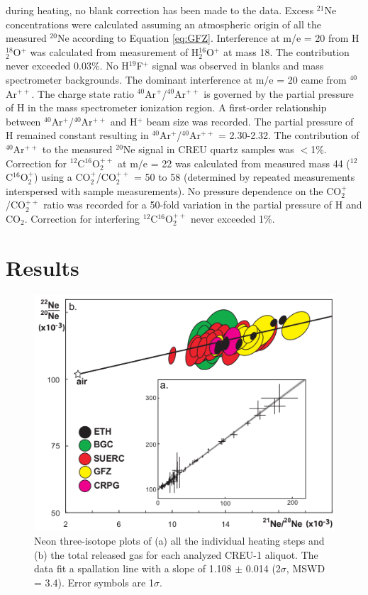 \documentclass[authoryear,review,12pt]{elsarticle}
\begin{document}
during heating, no blank correction has been made to the data.  Excess
$^{21}$Ne concentrations were calculated assuming an atmospheric
origin of all the measured $^{20}$Ne according to Equation
\ref{eq:GFZ}.  Interference at m/e = 20 from H$_2^{18}$O$^+$ was
calculated from measurement of H$_2^{16}$O$^+$ at mass 18. The
contribution never exceeded 0.03\%. No H$^{19}$F$^+$ signal was
observed in blanks and mass spectrometer backgrounds. The dominant
interference at m/e = 20 came from $^{40}$Ar$^{++}$. The charge state
ratio $^{40}$Ar$^+$/$^{40}$Ar$^{++}$ is governed by the partial
pressure of H in the mass spectrometer ionization region. A
first-order relationship between $^{40}$Ar$^+$/$^{40}$Ar$^{++}$ and
H$^+$ beam size was recorded.  The partial pressure of H remained
constant resulting in $^{40}$Ar$^+$/$^{40}$Ar$^{++}$ = 2.30-2.32. The
contribution of $^{40}$Ar$^{++}$ to the measured $^{20}$Ne signal in
CREU quartz samples was $<$1\%.  Correction for
$^{12}$C$^{16}$O$_2^{++}$ at m/e = 22 was calculated from measured
mass 44 ($^{12}$C$^{16}$O$_2^{+}$) using a CO$_2^{+}$/CO$_2^{++}$ = 50
to 58 (determined by repeated measurements interspersed with sample
measurements). No pressure dependence on the CO$_2^+$/CO$_2^{++}$
ratio was recorded for a 50-fold variation in the partial pressure of
H and CO$_2$. Correction for interfering $^{12}$C$^{16}$O$_2^{++}$
never exceeded 1\%.

\section{Results}
\label{sec:results}

\begin{figure}
\includegraphics[width=500pt]{Figure1.png}
\caption{Neon three-isotope plots of (a) all the individual heating
  steps and (b) the total released gas for each analyzed CREU-1
  aliquot.  The data fit a spallation line with a slope of 1.108 $\pm$
  0.014 (2$\sigma$, MSWD = 3.4). Error symbols are 1$\sigma$.}
\label{fig:3-isotope}
\end{figure}
\end{document}
